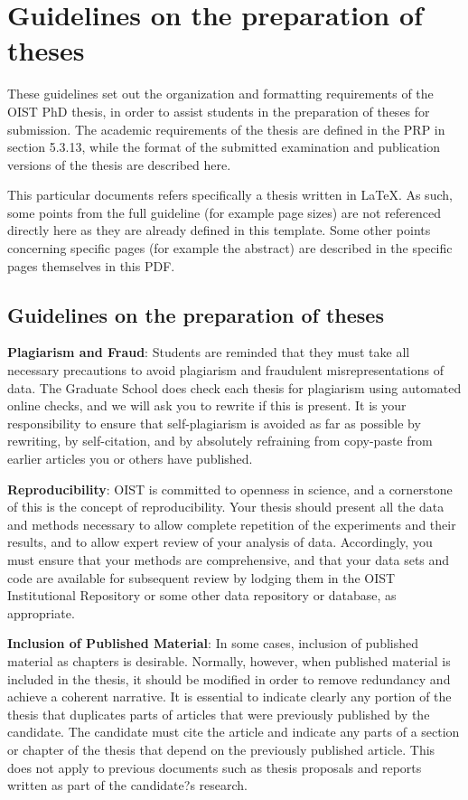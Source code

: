 
\chapter{Guidelines on the preparation of theses} \label{ch-1}

These guidelines set out the organization and formatting requirements of the OIST PhD thesis, in order to assist students in the preparation of theses for submission. The academic requirements of the thesis are defined in the PRP in section 5.3.13, while the format of the submitted examination and publication versions of the thesis are described here.

This particular documents refers specifically a thesis written in \LaTeX. As such, some points from the full guideline (for example page sizes) are not referenced directly here as they are already defined in this template. Some other points concerning specific pages (for example the abstract) are described in the specific pages themselves in this PDF.

\section{Guidelines on the preparation of theses}

\textbf{Plagiarism and Fraud}:  Students are reminded that they must take all necessary precautions to avoid plagiarism and fraudulent misrepresentations of data. The Graduate School does check each thesis for plagiarism using automated online checks, and we will ask you to rewrite if this is present.  It is your responsibility to ensure that self-plagiarism is avoided as far as possible by rewriting, by self-citation, and by absolutely refraining from copy-paste from earlier articles you or others have published.

\textbf{Reproducibility}: OIST is committed to openness in science, and a cornerstone of this is the concept of reproducibility. Your thesis should present all the data and methods necessary to allow complete repetition of the experiments and their results, and to allow expert review of your analysis of data. Accordingly, you must ensure that your methods are comprehensive, and that your data sets and code are available for subsequent review by lodging them in the OIST Institutional Repository or some other data repository or database, as appropriate.

\textbf{Inclusion of Published Material}: In some cases, inclusion of published material as chapters is desirable. Normally, however, when published material is included in the thesis, it should be modified in order to remove redundancy and achieve a coherent narrative. It is essential to indicate clearly any portion of the thesis that duplicates parts of articles that were previously published by the candidate. The candidate must cite the article and indicate any parts of a section or chapter of the thesis that depend on the previously published article. This does not apply to previous documents such as thesis proposals and reports written as part of the candidate?s research.

